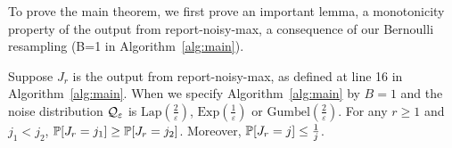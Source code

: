 To prove the main theorem, we first prove an important lemma, a monotonicity property of the output from report-noisy-max, a consequence of our Bernoulli resampling (B=1 in Algorithm~\ref{alg:main}).
\begin{lemma}
\label{lem:monotonicity}
	Suppose $J_r$ is the output from report-noisy-max, as defined at line 16 in Algorithm~\ref{alg:main}. When we specify Algorithm~\ref{alg:main} by $B=1$ and the noise distribution $\mathcal{Q}_{\varepsilon}$ is $\mathrm{Lap}(\frac{2}{\varepsilon})$, $\mathrm{Exp}(\frac{1}{\varepsilon})$ or $\mathrm{Gumbel}(\frac{2}{\varepsilon})$. For any $r\geq 1$ and $j_1 < j_2$, $\mathbb{P}[J_r = j_1]\geq \mathbb{P}[J_r = j_2]$. Moreover, $\mathbb{P}[J_r = j]\leq \frac{1}{j}$.
\end{lemma}


